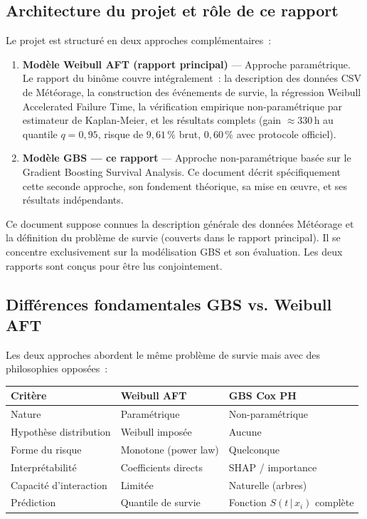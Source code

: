 \documentclass[a4paper,11pt]{article}
\begin{document}
\subsection{Architecture du projet et rôle de ce rapport}

Le projet est structuré en deux approches complémentaires~:

\begin{enumerate}[leftmargin=1.8em, label=\textbf{\arabic*.}]
  \item \textbf{Modèle Weibull AFT (rapport principal)} --- Approche paramétrique. Le rapport du
    binôme couvre intégralement~: la description des données CSV de Météorage, la construction
    des événements de survie, la régression Weibull Accelerated Failure Time, la vérification
    empirique non-paramétrique par estimateur de Kaplan-Meier, et les résultats complets (gain
    $\approx 330$\,h au quantile $q=0{,}95$, risque de $9{,}61\,\%$ brut, $0{,}60\,\%$ avec
    protocole officiel).

  \item \textbf{Modèle GBS --- ce rapport} --- Approche non-paramétrique basée sur le Gradient
    Boosting Survival Analysis. Ce document décrit spécifiquement cette seconde approche,
    son fondement théorique, sa mise en \oe uvre, et ses résultats indépendants.
\end{enumerate}

\begin{tcolorbox}[warnstyle, title={Périmètre de ce rapport}]
Ce document suppose connues la description générale des données Météorage et la définition du
problème de survie (couverts dans le rapport principal). Il se concentre exclusivement sur la
modélisation GBS et son évaluation. Les deux rapports sont conçus pour être lus conjointement.
\end{tcolorbox}

\subsection{Différences fondamentales GBS vs. Weibull AFT}

Les deux approches abordent le même problème de survie mais avec des philosophies opposées~:

\begin{center}
\begin{tabular}{p{3.8cm}p{5.2cm}p{5.2cm}}
\toprule
\textbf{Critère} & \textbf{Weibull AFT} & \textbf{GBS Cox PH} \\
\midrule
Nature & Paramétrique & Non-paramétrique \\
Hypothèse distribution & Weibull imposée & Aucune \\
Forme du risque & Monotone (power law) & Quelconque \\
Interprétabilité & Coefficients directs & SHAP / importance \\
Capacité d'interaction & Limitée & Naturelle (arbres) \\
Prédiction & Quantile de survie & Fonction $S(t\,|\,x_i)$ complète \\
\bottomrule
\end{tabular}
\end{center}
\end{document}
